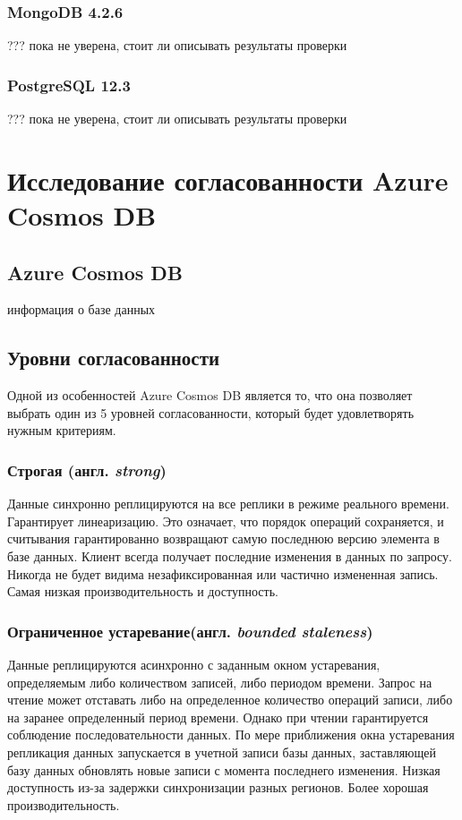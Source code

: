 \documentclass[12pt,  openany]{book}
\begin{document}
\subsection{MongoDB 4.2.6}
??? пока не уверена, стоит ли описывать результаты проверки
\subsection{PostgreSQL 12.3}
??? пока не уверена, стоит ли описывать результаты проверки

\chapter{Исследование согласованности Azure Cosmos DB}
\section{Azure Cosmos DB}
информация о базе данных
\section{Уровни согласованности \cite{cosmosConsistencyLevels}}
Одной из особенностей Azure Cosmos DB является то, что она позволяет выбрать один из 5 уровней согласованности, который будет удовлетворять нужным критериям.
\subsection{Строгая (англ.  \textit{strong})}
Данные синхронно реплицируются на все реплики в режиме реального времени. Гарантирует линеаризацию. Это означает, что порядок операций сохраняется, и считывания гарантированно возвращают самую последнюю версию элемента в базе данных. Клиент всегда получает последние изменения в данных по запросу. Никогда не будет видима незафиксированная или частично измененная запись. Самая низкая производительность и доступность.
\subsection{Ограниченное устаревание(англ.  \textit{bounded staleness})}
Данные реплицируются асинхронно с заданным окном устаревания, определяемым либо количеством записей, либо периодом времени. Запрос на чтение может отставать либо на определенное количество операций записи, либо на заранее определенный период времени. Однако при чтении гарантируется соблюдение последовательности данных. По мере приближения окна устаревания репликация данных запускается в учетной записи базы данных, заставляющей базу данных обновлять новые записи с момента последнего изменения. Низкая доступность из-за задержки синхронизации разных регионов. Более хорошая производительность.
\end{document}
